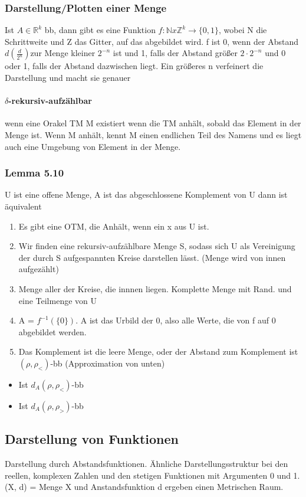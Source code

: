 \documentclass[ngerman]{scrartcl}
\begin{document}
\subsubsection{Darstellung/Plotten einer Menge}
Ist $ A \in \mathbb{R}^k $ bb, dann gibt es eine Funktion $ f : \mathbb{N} x \mathbb{Z}^k \rightarrow \{ 0, 1\}$, wobei N die Schrittweite und Z das Gitter, auf das abgebildet wird. f ist 0, wenn der Abstand $ d(\frac{d}{2^n}) $zur Menge kleiner $ 2^{-n} $ ist und 1, falls der Abstand größer $ 2 \cdot 2^{-n} $ und 0 oder 1, falls der Abstand dazwischen liegt. Ein größeres n verfeinert die Darstellung und macht sie genauer

\paragraph{$ \delta $-rekursiv-aufzählbar}
wenn eine Orakel TM M existiert wenn die TM anhält, sobald das Element in der Menge ist. Wenn M anhält, kennt M einen endlichen Teil des Namens und es liegt auch eine Umgebung von Element in der Menge.

\subsubsection{Lemma 5.10}
U ist eine offene Menge, A ist das abgeschlossene Komplement von U dann ist äquivalent
\begin{enumerate}
  \item Es gibt eine OTM, die Anhält, wenn ein x aus U ist.
  \item Wir finden eine rekursiv-aufzählbare Menge S, sodass sich U als Vereinigung der durch S aufgespannten Kreise darstellen lässt. (Menge wird von innen aufgezählt)
  \item Menge aller der Kreise, die innnen liegen. Komplette Menge mit Rand. und eine Teilmenge von U 
  \item A = $ f^{-1}(\{0\}) $. A ist das Urbild der 0, also alle Werte, die von f auf 0 abgebildet werden.
  \item Das Komplement ist die leere Menge, oder der Abstand zum Komplement ist $ (\rho, \rho_<) $-bb (Approximation von unten)
\end{enumerate}
\begin{itemize}
  \item Ist $ d_A (\rho, \rho_<) $-bb
  \item Ist $ d_A (\rho, \rho_>) $-bb
\end{itemize}

\subsection{Darstellung von Funktionen}
Darstellung durch Abstandsfunktionen. Ähnliche Darstellungsstruktur bei den reellen, komplexen Zahlen und den stetigen Funktionen mit Argumenten 0 und 1.
(X, d) = Menge X und Anstandsfunktion d ergeben einen Metrischen Raum.
\end{document}
